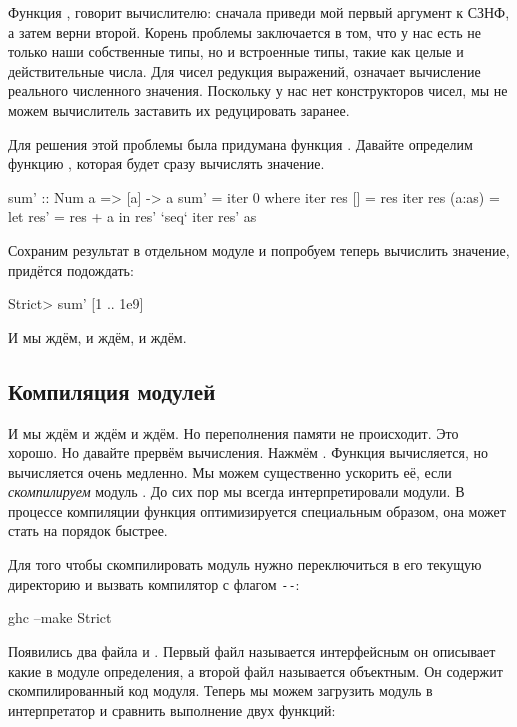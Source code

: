 Функция , говорит вычислителю: сначала приведи
мой первый аргумент к СЗНФ, а затем верни второй.
Корень проблемы заключается в том, что у нас есть не только
наши собственные типы, но и встроенные типы, такие как 
целые и действительные числа. Для чисел редукция выражений, означает
вычисление реального численного значения. Поскольку у нас нет 
конструкторов чисел, мы не можем вычислитель заставить их 
редуцировать заранее.

Для решения этой проблемы была придумана функция .
Давайте определим функцию , которая
будет сразу вычислять значение.

\begin{code}
sum' :: Num a => [a] -> a
sum' = iter 0 
    where iter res []        = res
          iter res (a:as)    = let res' = res + a
                               in  res' `seq` iter res' as 
\end{code}

Сохраним результат в отдельном модуле  и
попробуем теперь вычислить значение, придётся подождать:

\begin{code}
Strict> sum' [1 .. 1e9]
\end{code}

И мы ждём, и ждём, и ждём.


\subsection{Компиляция модулей}

И мы ждём и ждём и ждём. Но переполнения памяти не происходит.
Это хорошо. Но давайте прервём вычисления. Нажмём .
Функция  вычисляется, но вычисляется очень медленно.
Мы можем существенно ускорить её, если \emph{скомпилируем}
модуль . До сих пор мы всегда интерпретировали модули. 
В процессе компиляции функция оптимизируется специальным
образом, она может стать на порядок быстрее. 

Для того чтобы скомпилировать модуль нужно переключиться
в его текущую директорию и вызвать компилятор  с
флагом  \verb!--!:

\begin{code}
ghc --make Strict
\end{code}

Появились два файла  и . Первый
файл называется интерфейсным он описывает какие в модуле 
определения, а второй файл называется объектным. Он содержит
скомпилированный код модуля. Теперь мы можем загрузить 
модуль  в интерпретатор и сравнить выполнение двух функций:


